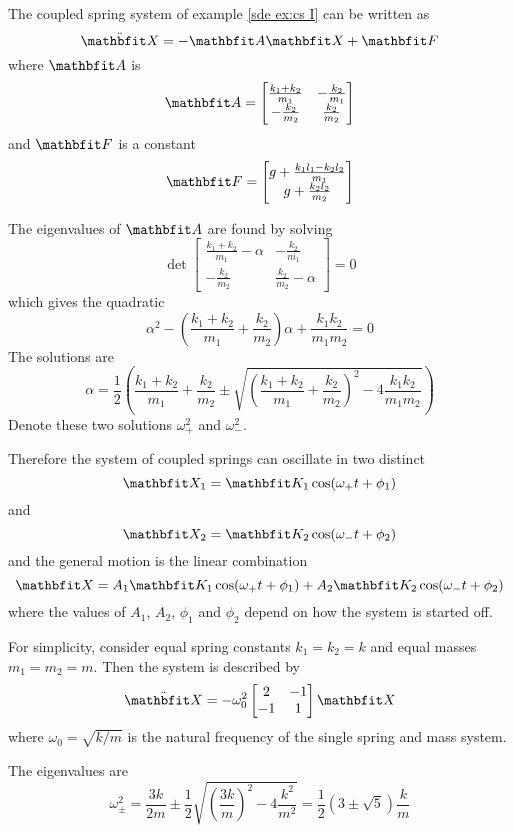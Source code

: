 \begin{example}

The coupled spring system of example \ref{sde ex:cs I} can be written as
$$\ddot{\vect{X}}=-\vect{A}\vect{X}+\vect{F}$$
where $\vect{A}$ is
$$\vect{A}=\begin{bmatrix}	\frac{k_1+k_2}{m_1} & -\frac{k_2}{m_1} 	 \\
  -\frac{k_2}{m_2} & \frac{k_2}{m_2}  \end{bmatrix} $$
and $\vect{F}$ is a constant
$$\vect{F}=\begin{bmatrix} g+\frac{k_1l_1-k_2l_2}{m_1} \\  
  g+\frac{k_2l_2}{m_2}\end{bmatrix}$$

The eigenvalues of $\vect{A}$ are found by solving
$$\det\begin{bmatrix} \frac{k_1+k_2}{m_1}-\alpha & -\frac{k_2}{m_1} \\
  -\frac{k_2}{m_2} & \frac{k_2}{m_2}-\alpha \end{bmatrix} =0$$
which gives the quadratic
$$\alpha^2-\left(\frac{k_1+k_2}{m_1}+\frac{k_2}{m_2}\right)\alpha+
\frac{k_1k_2}{m_1m_2}=0$$
The solutions are
$$\alpha=\frac{1}{2}\left(\frac{k_1+k_2}{m_1}+\frac{k_2}{m_2}\pm\sqrt{\left(
\frac{k_1+k_2}{m_1}+\frac{k_2}{m_2}\right)^2-4\frac{k_1k_2}{m_1m_2}}
\right)$$
Denote these two solutions $\omega_+^2$ and $\omega_-^2$.

Therefore the system of coupled springs can oscillate in two distinct
$$\vect{X}_1=\vect{K}_1\cos(\omega_{+}t+\phi_1)$$
and
$$\vect{X}_2=\vect{K}_2\cos(\omega_{-}t+\phi_2)$$
and the general motion is the linear combination
$$\vect{X}=A_1\vect{K}_1\cos(\omega_{+}t+\phi_1)
+A_2\vect{K}_2\cos(\omega_{-}t+\phi_2)$$
where the values of $A_1$, $A_2$, $\phi_1$ and $\phi_2$ depend on how the
system is started off.

For simplicity, consider equal spring constants $k_1=k_2=k$ and equal masses
$m_1=m_2=m$.   Then the system is described by
$$\ddot{\vect{X}}=-\omega_0^2
\begin{bmatrix} 2&-1\\-1&1\end{bmatrix}\vect{X}$$
where $\omega_0=\sqrt{k/m}$ is the natural frequency of the single spring and
mass system.  

The eigenvalues are
$$\omega_{\pm}^2=\frac{3k}{2m}\pm\frac{1}{2}\sqrt{\left(\frac{3k}{m}\right)^2
-4\frac{k^2}{m^2}}=\frac{1}{2}(3\pm\sqrt{5})\frac{k}{m}$$


\end{example}
